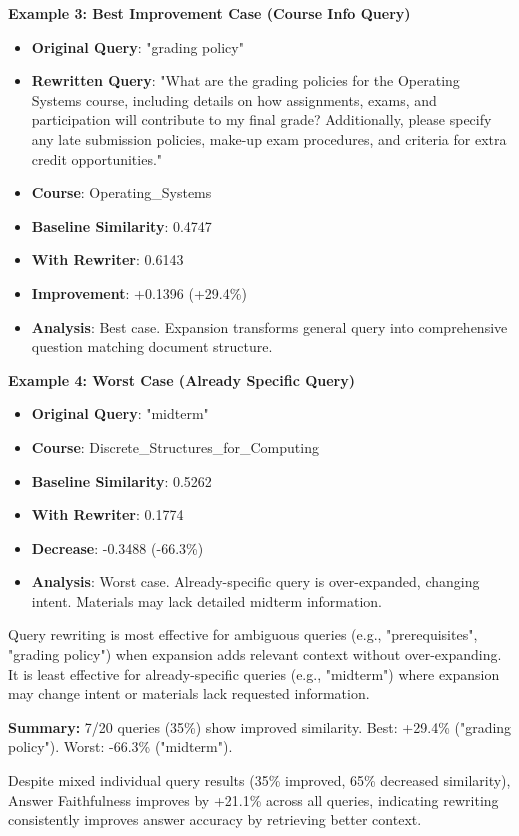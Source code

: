 \textbf{Example 3: Best Improvement Case (Course Info Query)}
\begin{itemize}
    \item \textbf{Original Query}: "grading policy"
    \item \textbf{Rewritten Query}: "What are the grading policies for the Operating Systems course, including details on how assignments, exams, and participation will contribute to my final grade? Additionally, please specify any late submission policies, make-up exam procedures, and criteria for extra credit opportunities."
    \item \textbf{Course}: Operating\_Systems
    \item \textbf{Baseline Similarity}: 0.4747
    \item \textbf{With Rewriter}: 0.6143
    \item \textbf{Improvement}: +0.1396 (+29.4\%)
    \item \textbf{Analysis}: Best case. Expansion transforms general query into comprehensive question matching document structure.
\end{itemize}

\textbf{Example 4: Worst Case (Already Specific Query)}
\begin{itemize}
    \item \textbf{Original Query}: "midterm"
    \item \textbf{Course}: Discrete\_Structures\_for\_Computing
    \item \textbf{Baseline Similarity}: 0.5262
    \item \textbf{With Rewriter}: 0.1774
    \item \textbf{Decrease}: -0.3488 (-66.3\%)
    \item \textbf{Analysis}: Worst case. Already-specific query is over-expanded, changing intent. Materials may lack detailed midterm information.
\end{itemize}

Query rewriting is most effective for ambiguous queries (e.g., "prerequisites", "grading policy") when expansion adds relevant context without over-expanding. It is least effective for already-specific queries (e.g., "midterm") where expansion may change intent or materials lack requested information.

\textbf{Summary:} 7/20 queries (35\%) show improved similarity. Best: +29.4\% ("grading policy"). Worst: -66.3\% ("midterm").

Despite mixed individual query results (35\% improved, 65\% decreased similarity), Answer Faithfulness improves by +21.1\% across all queries, indicating rewriting consistently improves answer accuracy by retrieving better context.

